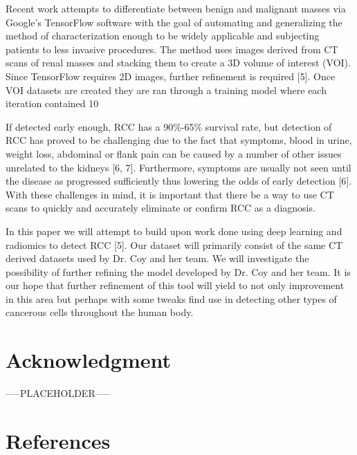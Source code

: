 \documentclass[conference]{IEEEtran}
\begin{document}
Recent work attempts to differentiate between benign and malignant masses via Google’s TensorFlow software with the goal of automating and generalizing the method of characterization enough to be widely applicable and subjecting patients to less invasive procedures.   The method uses images derived from CT scans of renal masses and stacking them to create a 3D volume of interest (VOI).  Since TensorFlow requires 2D images, further refinement is required [5]. Once VOI datasets are created they are ran through a training model where each iteration contained 10%

If detected early enough, RCC has a 90\%-65\% survival rate, but detection of RCC has proved to be challenging due to the fact that symptoms, blood in urine, weight loss, abdominal or flank pain can be caused by a number of other issues unrelated to the kidneys [6, 7]. Furthermore, symptoms are usually not seen until the disease as progressed sufficiently thus lowering the odds of early detection [6].  With these challenges in mind, it is important that there be a way to use CT scans to quickly and accurately eliminate or confirm RCC as a diagnosis.  

In this paper we will attempt to build upon work done using deep learning and radiomics to detect RCC [5].  Our dataset will primarily consist of the same CT derived datasets used by Dr. Coy and her team.  We will investigate the possibility of further refining the model developed by Dr. Coy and her team. It is our hope that further refinement of this tool will yield to not only improvement in this area but perhaps with some tweaks find use in detecting other types of cancerous cells throughout the human body.  


\section*{Acknowledgment}

-----PLACEHOLDER-----

\section*{References}
\end{document}
